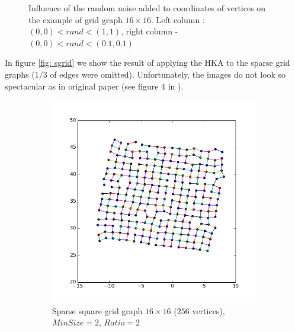 \documentclass[12pt,a4paper]{article}
\begin{document}
\begin{figure}
\caption{Influence of the random noise added to coordinates of vertices on the example of grid graph $16\times16$. Left column : $(0,0)<rand<(1,1)$, right column - $(0,0)<rand<(0.1,0.1)$}
\label{fig: compareRand}
\end{figure}	

\FloatBarrier

In figure \ref{fig: sgrid} we show the result of applying the HKA to the sparse grid graphs ($1/3$ of edges were omitted). Unfortunately, the images do not look so spectacular as in original paper (see figure $4$ in \cite{DavidHarel2002}).
\begin{figure}[htb]
	 \begin{subfigure}{0.5\textwidth}
		   \centering
           \includegraphics[scale=0.45]{results_Harel/HK_sgrid16x16_m2r2.png}
           \caption{Sparse square grid graph $16\times 16$ ($256$ vertices), $MinSize=2$, $Ratio=2$}
     \end{subfigure}
	 \begin{subfigure}{0.5\textwidth}
			\centering

\end{subfigure}
\end{figure}
\end{document}
